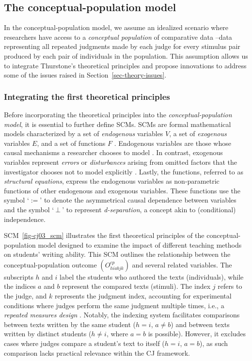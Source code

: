 \documentclass[
  authoryear,
  review,
  1p]{elsarticle}
\begin{document}
\subsection{The conceptual-population
model}\label{sec-theory-theoretical_P}

In the conceptual-population model, we assume an idealized scenario
where researchers have access to a \emph{conceptual population} of
comparative data --data representing all repeated judgments made by each
judge for every stimulus pair produced by each pair of individuals in
the population. This assumption allows us to integrate Thurstone's
theoretical principles and propose innovations to address some of the
issues raised in Section~\ref{sec-theory-issues}.

\subsubsection{Integrating the first theoretical
principles}\label{sec-theory-theoretical_P1}

Before incorporating the theoretical principles into the
\emph{conceptual-population model}, it is essential to further define
SCMs. SCMs are formal mathematical models characterized by a set of
\emph{endogenous} variables \(V\), a set of \emph{exogenous} variables
\(E\), and a set of functions \(F\)
\citep{Pearl_2009, Cinelli_et_al_2020}. Endogenous variables are those
whose causal mechanisms a researcher chooses to model \citep{Neal_2020}.
In contrast, exogenous variables represent \emph{errors} or
\emph{disturbances} arising from omitted factors that the investigator
chooses not to model explicitly \citep[pp.~27,68]{Pearl_2009}. Lastly,
the functions, referred to as \emph{structural equations}, express the
endogenous variables as non-parametric functions of other endogenous and
exogenous variables. These functions use the symbol `\(:=\)' to denote
the asymmetrical causal dependence between variables and the symbol
`\(\:\bot\:\)' to represent \emph{d-separation}, a concept akin to
(conditional) independence.

SCM~\ref{fig-cj03_scm} illustrates the first theoretical principles of
the conceptual-population model designed to examine the impact of
different teaching methods on students' writing ability. This SCM
outlines the relationship between the conceptual-population outcome
\((O^{cp}_{hiabjk})\) and several related variables. The subscripts
\(h\) and \(i\) label the students who authored the texts (individuals),
while the indices \(a\) and \(b\) represent the compared texts
(stimuli). The index \(j\) refers to the judge, and \(k\) represents the
judgment index, accounting for experimental conditions where judges
perform the same judgment multiple times, i.e., a \emph{repeated
measures design} \citep[pp.~366-376]{Lawson_2015}. Notably, the indexing
system facilitates comparisons between texts written by the same student
(\(h = i\), \(a \neq b\)) and between texts written by distinct students
(\(h \neq i\), where \(a = b\) is possible). However, it excludes cases
where judges compare a student's text to itself (\(h = i\), \(a = b\)),
as such comparison lacks practical relevance within the CJ framework.
\end{document}
